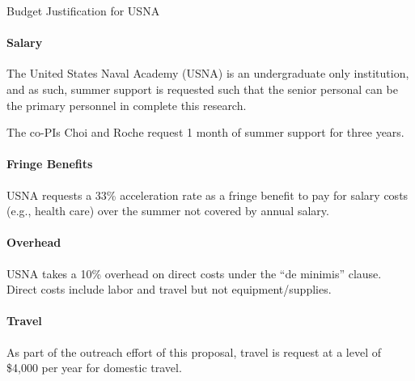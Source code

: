 \documentclass[10pt]{article}
\begin{document}
\begin{center}
{\LARGE Budget Justification for USNA}
\end{center}

\paragraph{Salary}
The United States Naval Academy (USNA) is an undergraduate only
institution, and as such, summer support is requested such that the
senior personal can be the primary personnel in complete this
research.  

The co-PIs Choi and Roche request 1 month of summer support for three years. 

\paragraph{Fringe Benefits}
USNA requests a 33\% acceleration rate as a fringe benefit to pay for salary
costs (e.g., health care) over the summer not covered by annual salary. 

\paragraph{Overhead}
USNA takes a 10\% overhead on direct costs under the ``de minimis'' clause.
Direct costs include labor and travel but not equipment/supplies. 

\paragraph{Travel}
As part of the outreach effort of this proposal, travel is request at
a level of \$4,000 per year for domestic travel.
\end{document}
